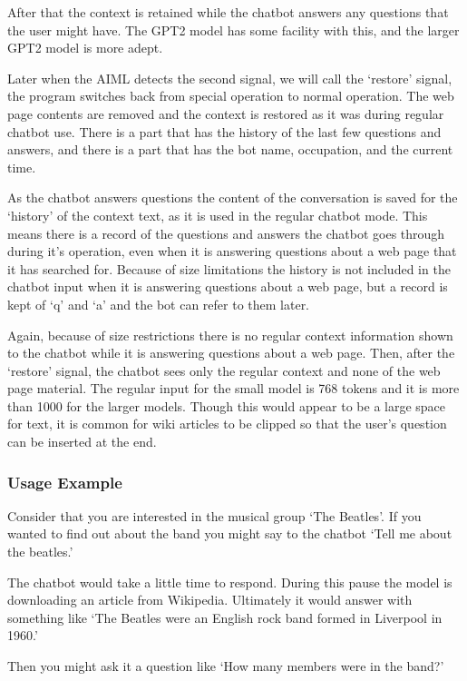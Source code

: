 After that the context is retained while the chatbot answers any questions that the user might have. The GPT2 model has some facility with this, and the larger GPT2 model is more adept.

Later when the AIML detects the second signal, we will call the `restore' signal, the program switches back from special operation to normal operation. The web page contents are removed and the context is restored as it was during regular chatbot use. There is a part that has the history of the last few questions and answers, and there is a part that has the bot name, occupation, and the current time.

As the chatbot answers questions the content of the conversation is saved for the `history' of the context text, as it is used in the regular chatbot mode. This means there is a record of the questions and answers the chatbot goes through during it's operation, even when it is answering questions about a web page that it has searched for. Because of size limitations the history is not included in the chatbot input when it is answering questions about a web page, but a record is kept of `q' and `a' and the bot can refer to them later.

Again, because of size restrictions there is no regular context information shown to the chatbot while it is answering questions about a web page. Then, after the `restore' signal, the chatbot sees only the regular context and none of the web page material. The regular input for the small model is 768 tokens and it is more than 1000 for the larger models. Though this would appear to be a large space for text, it is common for wiki articles to be clipped so that the user's question can be inserted at the end.

\subsubsection{Usage Example}

Consider that you are interested in the musical group `The Beatles'. If you wanted to find out about the band you might say to the chatbot `Tell me about the beatles.'

The chatbot would take a little time to respond. During this pause the model is downloading an article from Wikipedia. Ultimately it would answer with something like `The Beatles were an English rock band formed in Liverpool in 1960.'

Then you might ask it a question like `How many members were in the band?'

